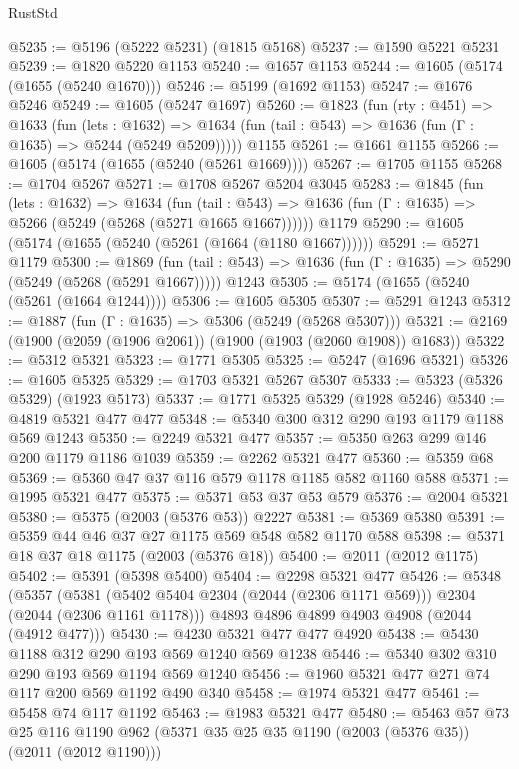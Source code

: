 \begin{lexlean}{RustStd}
\begin{coremodule}
@5235 := @5196 (@5222 @5231) (@1815 @5168)
@5237 := @1590 @5221 @5231
@5239 := @1820 @5220 @1153
@5240 := @1657 @1153
@5244 := @1605 (@5174 (@1655 (@5240 @1670)))
@5246 := @5199 (@1692 @1153)
@5247 := @1676 @5246
@5249 := @1605 (@5247 @1697)
@5260 := @1823
    (fun (rty : @451) =>
    @1633
      (fun (lets : @1632) =>
      @1634 (fun (tail : @543) => @1636 (fun (Γ : @1635) => @5244 (@5249 @5209)))))
    @1155
@5261 := @1661 @1155
@5266 := @1605 (@5174 (@1655 (@5240 (@5261 @1669))))
@5267 := @1705 @1155
@5268 := @1704 @5267
@5271 := @1708 @5267 @5204 @3045
@5283 := @1845
    (fun (lets : @1632) =>
    @1634
      (fun (tail : @543) => @1636 (fun (Γ : @1635) => @5266 (@5249 (@5268 (@5271 @1665 @1667))))))
    @1179
@5290 := @1605 (@5174 (@1655 (@5240 (@5261 (@1664 (@1180 @1667))))))
@5291 := @5271 @1179
@5300 := @1869
    (fun (tail : @543) => @1636 (fun (Γ : @1635) => @5290 (@5249 (@5268 (@5291 @1667)))))
    @1243
@5305 := @5174 (@1655 (@5240 (@5261 (@1664 @1244))))
@5306 := @1605 @5305
@5307 := @5291 @1243
@5312 := @1887 (fun (Γ : @1635) => @5306 (@5249 (@5268 @5307)))
@5321 := @2169 (@1900 (@2059 (@1906 @2061)) (@1900 (@1903 (@2060 @1908)) @1683))
@5322 := @5312 @5321
@5323 := @1771 @5305
@5325 := @5247 (@1696 @5321)
@5326 := @1605 @5325
@5329 := @1703 @5321 @5267 @5307
@5333 := @5323 (@5326 @5329) (@1923 @5173)
@5337 := @1771 @5325 @5329 (@1928 @5246)
@5340 := @4819 @5321 @477 @477
@5348 := @5340 @300 @312 @290 @193 @1179 @1188 @569 @1243
@5350 := @2249 @5321 @477
@5357 := @5350 @263 @299 @146 @200 @1179 @1186 @1039
@5359 := @2262 @5321 @477
@5360 := @5359 @68
@5369 := @5360 @47 @37 @116 @579 @1178 @1185 @582 @1160 @588
@5371 := @1995 @5321 @477
@5375 := @5371 @53 @37 @53 @579
@5376 := @2004 @5321
@5380 := @5375 (@2003 (@5376 @53)) @2227
@5381 := @5369 @5380
@5391 := @5359 @44 @46 @37 @27 @1175 @569 @548 @582 @1170 @588
@5398 := @5371 @18 @37 @18 @1175 (@2003 (@5376 @18))
@5400 := @2011 (@2012 @1175)
@5402 := @5391 (@5398 @5400)
@5404 := @2298 @5321 @477
@5426 := @5348
    (@5357
      (@5381 (@5402 @5404 @2304 (@2044 (@2306 @1171 @569))) @2304 (@2044 (@2306 @1161 @1178)))
      @4893
      @4896
      @4899
      @4903
      @4908
      (@2044 (@4912 @477)))
@5430 := @4230 @5321 @477 @477 @4920
@5438 := @5430 @1188 @312 @290 @193 @569 @1240 @569 @1238
@5446 := @5340 @302 @310 @290 @193 @569 @1194 @569 @1240
@5456 := @1960 @5321 @477 @271 @74 @117 @200 @569 @1192 @490 @340
@5458 := @1974 @5321 @477
@5461 := @5458 @74 @117 @1192
@5463 := @1983 @5321 @477
@5480 := @5463
    @57
    @73
    @25
    @116
    @1190
    @962
    (@5371 @35 @25 @35 @1190 (@2003 (@5376 @35)) (@2011 (@2012 @1190)))

\end{coremodule}
\end{lexlean}
